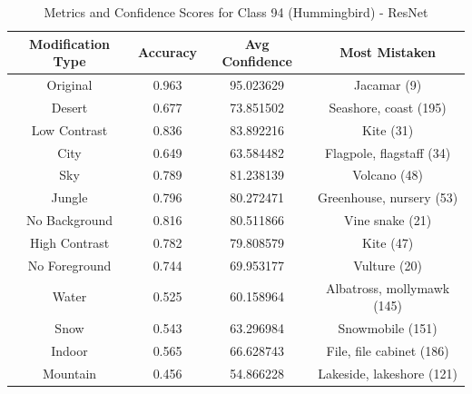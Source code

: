 \begin{table}
	\centering
	\begin{tabular}{|c|c|c|c|}
		\hline
		\textbf{Modification Type} & \textbf{Accuracy} & \textbf{Avg Confidence} & \textbf{Most Mistaken} \\
		\hline
		Original & 0.963 & 95.023629 & Jacamar (9) \\
		\hline
		Desert & 0.677 & 73.851502 & Seashore, coast (195) \\
		\hline
		Low Contrast & 0.836 & 83.892216 & Kite (31) \\
		\hline
		City & 0.649 & 63.584482 & Flagpole, flagstaff (34) \\
		\hline
		Sky & 0.789 & 81.238139 & Volcano (48) \\
		\hline
		Jungle & 0.796 & 80.272471 & Greenhouse, nursery (53) \\
		\hline
		No Background & 0.816 & 80.511866 & Vine snake (21) \\
		\hline
		High Contrast & 0.782 & 79.808579 & Kite (47) \\
		\hline
		No Foreground & 0.744 & 69.953177 & Vulture (20) \\
		\hline
		Water & 0.525 & 60.158964 & Albatross, mollymawk (145) \\
		\hline
		Snow & 0.543 & 63.296984 & Snowmobile (151) \\
		\hline
		Indoor & 0.565 & 66.628743 & File, file cabinet (186) \\
		\hline
		Mountain & 0.456 & 54.866228 & Lakeside, lakeshore (121) \\
		\hline
	\end{tabular}
	\caption{Metrics and Confidence Scores for Class 94 (Hummingbird) - ResNet}
	\label{tab:metrics_confidence_class_94_resnet}
\end{table}

